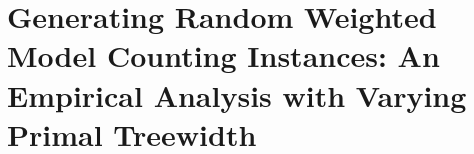 \chapter{Generating Random Weighted Model Counting Instances: An Empirical Analysis with Varying Primal Treewidth} \label{chapter:comparison}
